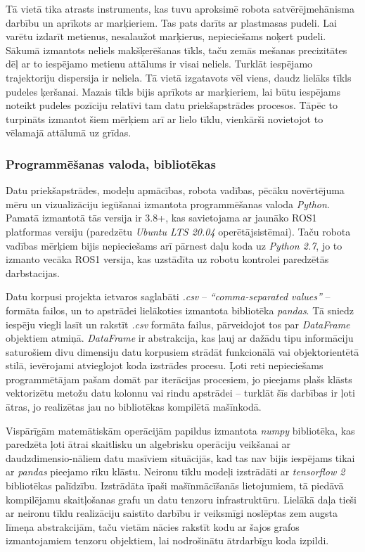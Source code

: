 \documentclass[12pt, a4paper]{article}
\numberwithin{equation}{section} %
\begin{document}
Tā vietā tika atrasts instruments, kas tuvu aproksimē robota satvērējmehānisma darbību un aprīkots ar marķieriem. Tas pats darīts ar plastmasas pudeli. Lai varētu izdarīt metienus, nesalaužot marķierus, nepieciešams noķert pudeli. Sākumā izmantots neliels makšķerēšanas tīkls, taču zemās mešanas precizitātes dēļ ar to iespējamo metienu attālums ir visai neliels. Turklāt iespējamo trajektoriju dispersija ir neliela. Tā vietā izgatavots vēl viens, daudz lielāks tīkls pudeles ķeršanai. Mazais tīkls bijis aprīkots ar marķieriem, lai būtu iespējams noteikt pudeles pozīciju relatīvi tam datu priekšapstrādes procesos. Tāpēc to turpināts izmantot šiem mērķiem arī ar lielo tīklu, vienkārši novietojot to vēlamajā attālumā uz grīdas. 

\subsubsection{Programmēšanas valoda, bibliotēkas}

Datu priekšapstrādes, modeļu apmācības, robota vadības, pēcāku novērtējuma mēru un vizualizāciju iegūšanai izmantota programmēšanas valoda \textit{Python}. Pamatā izmantotā tās versija ir 3.8+, kas savietojama ar jaunāko ROS1 platformas versiju (paredzētu \textit{Ubuntu LTS 20.04} operētājsistēmai). Taču robota vadības mērķiem bijis nepieciešams arī pārnest daļu koda uz \textit{Python 2.7}, jo to izmanto vecāka ROS1 versija, kas uzstādīta uz robotu kontrolei paredzētās darbstacijas.

Datu korpusi projekta ietvaros saglabāti \textit{.csv} -- \textit{``comma-separated values''} -- formāta failos, un to apstrādei lielākoties izmantota bibliotēka \textit{pandas}. Tā sniedz iespēju viegli lasīt un rakstīt \textit{.csv} formāta failus, pārveidojot tos par \textit{DataFrame} objektiem atmiņā. \textit{DataFrame} ir abstrakcija, kas ļauj ar dažādu tipu informāciju saturošiem divu dimensiju datu korpusiem strādāt funkcionālā vai objektorientētā stilā, ievērojami atvieglojot koda izstrādes procesu. Ļoti reti nepieciešams programmētājam pašam domāt par iterācijas procesiem, jo pieejams plašs klāsts vektorizētu metožu datu kolonnu vai rindu apstrādei -- turklāt šīs darbības ir ļoti ātras, jo realizētas jau no bibliotēkas kompilētā mašīnkodā. 

Vispārīgām matemātiskām operācijām papildus izmantota \textit{numpy} bibliotēka, kas paredzēta ļoti ātrai skaitlisku un algebrisku operāciju veikšanai ar daudzdimensio-nāliem datu masīviem situācijās, kad tas nav bijis iespējams tikai ar \textit{pandas} pieejamo rīku klāstu. Neironu tīklu modeļi izstrādāti ar \textit{tensorflow 2} bibliotēkas palīdzību. Izstrādāta īpaši mašīnmācīšanās lietojumiem, tā piedāvā kompilējamu skaitļošanas grafu un datu tenzoru infrastruktūru. Lielākā daļa tieši ar neironu tīklu realizāciju saistīto darbību ir veiksmīgi noslēptas zem augsta līmeņa abstrakcijām, taču vietām nācies rakstīt kodu ar šajos grafos izmantojamiem tenzoru objektiem, lai nodrošinātu ātrdarbīgu koda izpildi.
\end{document}
